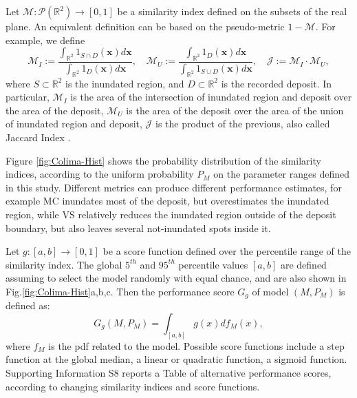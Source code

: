 \documentclass{article}
\begin{document}
Let $\mathcal M:\mathcal P(\mathbb R^2)\rightarrow[0,1]$ be a similarity index defined on the subsets of the real plane. An equivalent definition can be based on the pseudo-metric $1-\mathcal M$. For example, we define
$$\mathcal M_I:=\frac{\int_{\mathbb R^2} 1_{S \cap D}(\textbf{x}) d\textbf{x}}{\int_{\mathbb R^2} 1_D(\textbf{x})d\textbf{x}},\quad \mathcal M_U:=\frac{\int_{\mathbb R^2} 1_D(\textbf{x})d\textbf{x}}{\int_{\mathbb R^2} 1_{S \cup D}(\textbf{x}) d\textbf{x}}, \quad \mathcal J:=\mathcal M_I\cdot \mathcal M_U,$$
where $S\subset \mathbb R^2$ is the inundated region, and $D\subset \mathbb R^2$ is the recorded deposit. In particular, $\mathcal M_I$ is the area of the intersection of inundated region and deposit over the area of the deposit, $\mathcal M_U$ is the area of the deposit over the area of the union of inundated region and deposit, $\mathcal J$ is the product of the previous, also called Jaccard Index \citep{Jaccard1901}.

Figure \ref{fig:Colima-Hist} shows the probability distribution of the similarity indices, according to the uniform probability $P_M$ on the parameter ranges defined in this study. Different metrics can produce different performance estimates, for example MC inundates most of the deposit, but overestimates the inundated region, while VS relatively reduces the inundated region outside of the deposit boundary, but also leaves several not-inundated spots inside it.

Let $g:[a,b]\rightarrow[0,1]$ be a score function defined over the percentile range of the similarity index. The global $5^{th}$ and $95^{th}$ percentile values $[a,b]$ are defined assuming to select the model randomly with equal chance, and are also shown in Fig.\ref{fig:Colima-Hist}a,b,c. Then the performance score $G_g$ of model $\left(M, P_M\right)$ is defined as:
$$G_g\left(M, P_M\right)=\int_{[a,b]} g(x) df_M(x),$$
where $f_M$ is the pdf related to the model. Possible score functions include a step function at the global median, a linear or quadratic function, a sigmoid function. Supporting Information S8 reports a Table of alternative performance scores, according to changing similarity indices and score functions.
\end{document}
